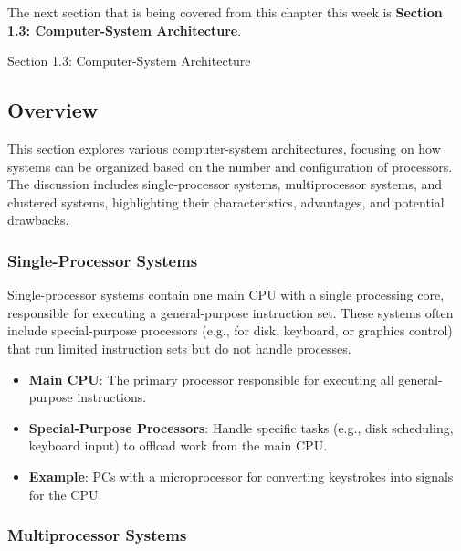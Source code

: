 The next section that is being covered from this chapter this week is \textbf{Section 1.3: Computer-System Architecture}.

\begin{notes}{Section 1.3: Computer-System Architecture}
    \subsection*{Overview}

    This section explores various computer-system architectures, focusing on how systems can be organized based on the number and configuration of processors. The discussion includes single-processor 
    systems, multiprocessor systems, and clustered systems, highlighting their characteristics, advantages, and potential drawbacks.
    
    \subsubsection*{Single-Processor Systems}
    
    Single-processor systems contain one main CPU with a single processing core, responsible for executing a general-purpose instruction set. These systems often include special-purpose processors 
    (e.g., for disk, keyboard, or graphics control) that run limited instruction sets but do not handle processes.
    
    \begin{highlight}
    
    \begin{itemize}
        \item \textbf{Main CPU}: The primary processor responsible for executing all general-purpose instructions.
        \item \textbf{Special-Purpose Processors}: Handle specific tasks (e.g., disk scheduling, keyboard input) to offload work from the main CPU.
        \item \textbf{Example}: PCs with a microprocessor for converting keystrokes into signals for the CPU.
    \end{itemize}
    
    \end{highlight}
    
    \subsubsection*{Multiprocessor Systems}
    

\end{notes}
